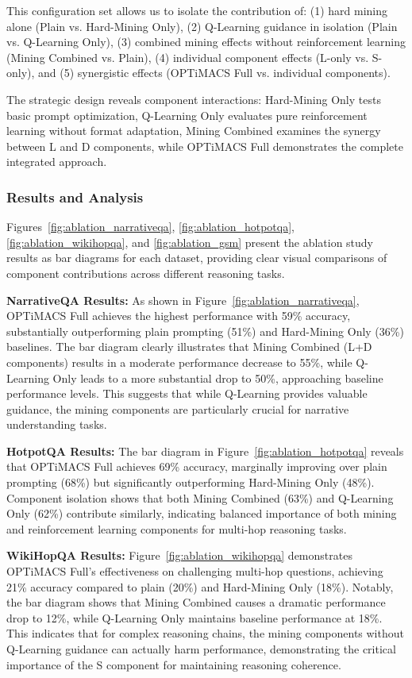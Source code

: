 This configuration set allows us to isolate the contribution of: (1) hard mining alone (Plain vs. Hard-Mining Only), (2) Q-Learning guidance in isolation (Plain vs. Q-Learning Only), (3) combined mining effects without reinforcement learning (Mining Combined vs. Plain), (4) individual component effects (L-only vs. S-only), and (5) synergistic effects (OPTiMACS Full vs. individual components).

The strategic design reveals component interactions: Hard-Mining Only tests basic prompt optimization, Q-Learning Only evaluates pure reinforcement learning without format adaptation, Mining Combined examines the synergy between L and D components, while OPTiMACS Full demonstrates the complete integrated approach.

\subsubsection{Results and Analysis}
Figures~\ref{fig:ablation_narrativeqa}, \ref{fig:ablation_hotpotqa}, \ref{fig:ablation_wikihopqa}, and \ref{fig:ablation_gsm} present the ablation study results as bar diagrams for each dataset, providing clear visual comparisons of component contributions across different reasoning tasks.

\textbf{NarrativeQA Results:} As shown in Figure~\ref{fig:ablation_narrativeqa}, OPTiMACS Full achieves the highest performance with 59\% accuracy, substantially outperforming plain prompting (51\%) and Hard-Mining Only (36\%) baselines. The bar diagram clearly illustrates that Mining Combined (L+D components) results in a moderate performance decrease to 55\%, while Q-Learning Only leads to a more substantial drop to 50\%, approaching baseline performance levels. This suggests that while Q-Learning provides valuable guidance, the mining components are particularly crucial for narrative understanding tasks.

\textbf{HotpotQA Results:} The bar diagram in Figure~\ref{fig:ablation_hotpotqa} reveals that OPTiMACS Full achieves 69\% accuracy, marginally improving over plain prompting (68\%) but significantly outperforming Hard-Mining Only (48\%). Component isolation shows that both Mining Combined (63\%) and Q-Learning Only (62\%) contribute similarly, indicating balanced importance of both mining and reinforcement learning components for multi-hop reasoning tasks.

\textbf{WikiHopQA Results:} Figure~\ref{fig:ablation_wikihopqa} demonstrates OPTiMACS Full's effectiveness on challenging multi-hop questions, achieving 21\% accuracy compared to plain (20\%) and Hard-Mining Only (18\%). Notably, the bar diagram shows that Mining Combined causes a dramatic performance drop to 12\%, while Q-Learning Only maintains baseline performance at 18\%. This indicates that for complex reasoning chains, the mining components without Q-Learning guidance can actually harm performance, demonstrating the critical importance of the S component for maintaining reasoning coherence.


